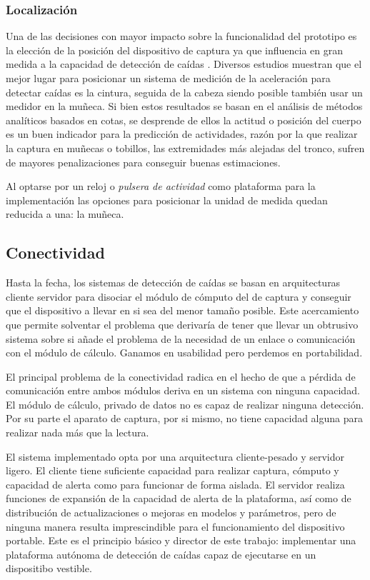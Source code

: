 \subsubsection{Localización}

Una de las decisiones con mayor impacto sobre la funcionalidad del prototipo es la elección de la posición del dispositivo de captura ya que influencia en gran medida a la capacidad de detección de caídas \cite{Kangas2008}. Diversos estudios muestran que el mejor lugar para posicionar un sistema de medición de la aceleración para detectar caídas es la cintura, seguida de la cabeza siendo posible también usar un medidor en la muñeca\cite{Chen2005, Kangas2008, Noury2007}. Si bien estos resultados se basan en el análisis de métodos analíticos basados en cotas, se desprende de ellos la actitud o posición del cuerpo es un buen indicador para la predicción de actividades, razón por la que realizar la captura en muñecas o tobillos, las extremidades más alejadas del tronco, sufren de mayores penalizaciones para conseguir buenas estimaciones.

Al optarse por un reloj o \textit{pulsera de actividad} como plataforma para la implementación las opciones para posicionar la unidad de medida quedan reducida a una: la muñeca.

\subsection{Conectividad}

Hasta la fecha, los sistemas de detección de caídas se basan en arquitecturas cliente servidor para disociar el módulo de cómputo del de captura y conseguir que el dispositivo a llevar en si sea del menor tamaño posible. Este acercamiento que permite solventar el problema que derivaría de tener que llevar un obtrusivo sistema sobre si añade el problema de la necesidad de un enlace o comunicación con el módulo de cálculo. Ganamos en usabilidad pero perdemos en portabilidad.

El principal problema de la conectividad radica en el hecho de que a pérdida de comunicación entre ambos módulos deriva en un sistema con ninguna capacidad. El módulo de cálculo, privado de datos no es capaz de realizar ninguna detección. Por su parte el aparato de captura, por si mismo, no tiene capacidad alguna para realizar nada más que la lectura.

El sistema implementado opta por una arquitectura cliente-pesado y servidor ligero. El cliente tiene suficiente capacidad para realizar captura, cómputo y capacidad de alerta como para funcionar de forma aislada. El servidor realiza funciones de expansión de la capacidad de alerta de la plataforma, así como de distribución de actualizaciones o mejoras en modelos y parámetros, pero de ninguna manera resulta imprescindible para el funcionamiento del dispositivo portable. Este es el principio básico y director de este trabajo: implementar una plataforma autónoma de detección de caídas capaz de ejecutarse en un dispositibo vestible.

